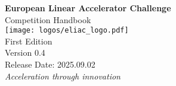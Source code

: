 
\begin{titlepage}
    \centering
    \vspace*{2cm}
    {\Huge\bfseries European Linear Accelerator Challenge\\[0.5cm]}
    {\LARGE Competition Handbook\\[2cm]}
    \texttt{[image: logos/eliac\_logo.pdf]}\\[2cm]
    {\Large First Edition\\[2cm]}
    {\Large Version 0.4\\[0.5cm]}
    {\large Release Date: 2025.09.02\\[2cm]}
    \vfill
    {\large\textit{Acceleration through innovation}}\\[0.5cm]
\end{titlepage}